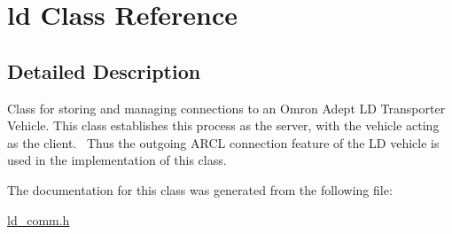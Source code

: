 \hypertarget{classld}{}\section{ld Class Reference}
\label{classld}


\subsection{Detailed Description}
Class for storing and managing connections to an Omron Adept LD Transporter Vehicle. This class establishes this process as the server, with the vehicle acting as the client.~\newline
 Thus the outgoing A\+R\+CL connection feature of the LD vehicle is used in the implementation of this class. 

The documentation for this class was generated from the following file\+:\begin{DoxyCompactItemize}
\item 
\hyperlink{ld__comm_8h}{ld\+\_\+comm.\+h}\end{DoxyCompactItemize}
